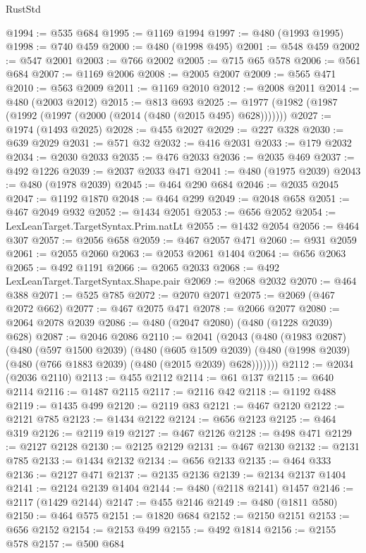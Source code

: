 \begin{lexlean}{RustStd}
\begin{coremodule}
{\begin{coremodule}
{{{{{{{{{{{{{{{{{{{{{{{{{{{{{{{{{@1994 := @535 @684
@1995 := @1169 @1994
@1997 := @480 (@1993 @1995)
@1998 := @740 @459
@2000 := @480 (@1998 @495)
@2001 := @548 @459
@2002 := @547 @2001
@2003 := @766 @2002
@2005 := @715 @65 @578
@2006 := @561 @684
@2007 := @1169 @2006
@2008 := @2005 @2007
@2009 := @565 @471
@2010 := @563 @2009
@2011 := @1169 @2010
@2012 := @2008 @2011
@2014 := @480 (@2003 @2012)
@2015 := @813 @693
@2025 := @1977 (@1982 (@1987 (@1992 (@1997 (@2000 (@2014 (@480 (@2015 @495) @628)))))))
@2027 := @1974 (@1493 @2025)
@2028 := @455 @2027
@2029 := @227 @328
@2030 := @639 @2029
@2031 := @571 @32
@2032 := @416 @2031
@2033 := @179 @2032
@2034 := @2030 @2033
@2035 := @476 @2033
@2036 := @2035 @469
@2037 := @492 @1226
@2039 := @2037 @2033 @471
@2041 := @480 (@1975 @2039)
@2043 := @480 (@1978 @2039)
@2045 := @464 @290 @684
@2046 := @2035 @2045
@2047 := @1192 @1870
@2048 := @464 @299
@2049 := @2048 @658
@2051 := @467 @2049 @932
@2052 := @1434 @2051
@2053 := @656 @2052
@2054 := LexLeanTarget.TargetSyntax.Prim.natLt
@2055 := @1432 @2054
@2056 := @464 @307
@2057 := @2056 @658
@2059 := @467 @2057 @471
@2060 := @931 @2059
@2061 := @2055 @2060
@2063 := @2053 @2061 @1404
@2064 := @656 @2063
@2065 := @492 @1191
@2066 := @2065 @2033
@2068 := @492 LexLeanTarget.TargetSyntax.Shape.pair
@2069 := @2068 @2032
@2070 := @464 @388
@2071 := @525 @785
@2072 := @2070 @2071
@2075 := @2069 (@467 @2072 @662)
@2077 := @467 @2075 @471
@2078 := @2066 @2077
@2080 := @2064 @2078 @2039
@2086 := @480 (@2047 @2080) (@480 (@1228 @2039) @628)
@2087 := @2046 @2086
@2110 := @2041
    (@2043
      (@480
        (@1983 @2087)
        (@480
          (@597 @1500 @2039)
          (@480
            (@605 @1509 @2039)
            (@480 (@1998 @2039) (@480 (@766 @1883 @2039) (@480 (@2015 @2039) @628)))))))
@2112 := @2034 (@2036 @2110)
@2113 := @455 @2112
@2114 := @61 @137
@2115 := @640 @2114
@2116 := @1487 @2115
@2117 := @2116 @42
@2118 := @1192 @488
@2119 := @1435 @499
@2120 := @2119 @83
@2121 := @467 @2120
@2122 := @2121 @785
@2123 := @1434 @2122
@2124 := @656 @2123
@2125 := @464 @319
@2126 := @2119 @19
@2127 := @467 @2126
@2128 := @498 @471
@2129 := @2127 @2128
@2130 := @2125 @2129
@2131 := @467 @2130
@2132 := @2131 @785
@2133 := @1434 @2132
@2134 := @656 @2133
@2135 := @464 @333
@2136 := @2127 @471
@2137 := @2135 @2136
@2139 := @2134 @2137 @1404
@2141 := @2124 @2139 @1404
@2144 := @480 (@2118 @2141) @1457
@2146 := @2117 (@1429 @2144)
@2147 := @455 @2146
@2149 := @480 (@1811 @580)
@2150 := @464 @575
@2151 := @1820 @684
@2152 := @2150 @2151
@2153 := @656 @2152
@2154 := @2153 @499
@2155 := @492 @1814
@2156 := @2155 @578
@2157 := @500 @684
}}}}}}}}}}}}}}}}}}}}}}}}}}}}}}}}}
\end{coremodule}}
\end{coremodule}
\end{lexlean}
